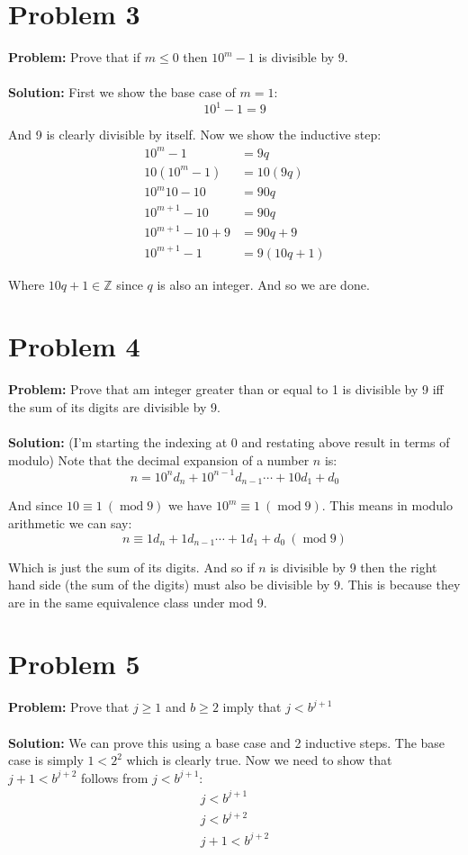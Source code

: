 \documentclass{article}
\begin{document}
\section*{Problem 3}
\textbf{Problem:} Prove that if $m\le0$ then $10^m-1$ is divisible by 9.
\\\\
\textbf{Solution:} First we show the base case of $m=1$:
$$10^1-1=9$$

And 9 is clearly divisible by itself. Now we show the inductive step:
\begin{align*}
  10^m-1&=9q\\
  10(10^m-1)&=10(9q)\\
  10^m10-10&=90q\\
  10^{m+1}-10&=90q\\
  10^{m+1}-10+9&=90q+9\\
  10^{m+1}-1&=9(10q+1)
\end{align*}

Where $10q+1\in\mathbb Z$ since $q$ is also an integer. And so we are done.

\section*{Problem 4}
\textbf{Problem:} Prove that am integer greater than or equal to 1 is divisible by 9 iff the sum of its digits are divisible by 9.
\\\\
\textbf{Solution:} (I'm starting the indexing at 0 and restating above result in terms of modulo) Note that the decimal expansion of a number $n$ is:
$$n=10^nd_n+10^{n-1}d_{n-1}\cdots+10d_1+d_0$$

And since $10\equiv 1\ (\operatorname{mod } 9)$ we have $10^m\equiv 1\ (\operatorname{mod } 9)$. This means in modulo arithmetic we can say:
$$n\equiv 1d_n+1d_{n-1}\cdots+1d_1+d_0\ (\operatorname{mod } 9)$$

Which is just the sum of its digits. And so if $n$ is divisible by 9 then the right hand side (the sum of the digits) must also be divisible by 9. This is because they are in the same equivalence class under mod 9.

\section*{Problem 5}
\textbf{Problem:} Prove that $j\ge 1$ and $b\ge 2$ imply that $j<b^{j+1}$
\\\\
\textbf{Solution:} We can prove this using a base case and 2 inductive steps. The base case is simply $1<2^2$ which is clearly true. Now we need to show that $j+1<b^{j+2}$ follows from $j<b^{j+1}$:
\begin{align*}
  j<b^{j+1}\\
  j<b^{j+2}\tag{multiply by positive integer, always bigger}\\
  j+1<b^{j+2}\tag{as long as $j\le b$}
\end{align*}
\end{document}
